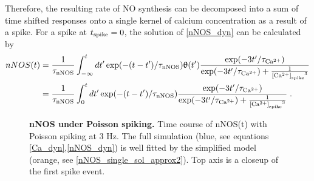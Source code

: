 \documentclass[10pt,letterpaper]{article}
\begin{document}
Therefore, the resulting rate of NO synthesis can be decomposed into a sum of time shifted responses onto a single kernel of calcium concentration as a result of a spike. For a spike at $t_{\rm spike}=0$, the solution of \eqref{nNOS_dyn} can be calculated by
\begin{equation}
\begin{split}
nNOS(t) &= \frac{1}{\tau_{\rm nNOS}}\int_{-\infty}^t dt' \exp(-(t-t')/\tau_{\rm nNOS}) \uptheta(t') \frac{\exp(-3t'/\tau_{\rm Ca^{2+}})}{\exp(-3t'/\tau_{\rm Ca^{2+}}) + \frac{1}{{{\rm [Ca^{2+}]}_{\rm spike}}^3}} \\
&= \frac{1}{\tau_{\rm nNOS}}\int_{0}^t dt' \exp(-(t-t')/\tau_{\rm nNOS}) \frac{\exp(-3t'/\tau_{\rm Ca^{2+}})}{\exp(-3t'/\tau_{\rm Ca^{2+}}) + \frac{1}{{{\rm [Ca^{2+}]}_{\rm spike}}^3}}\;.
\end{split}\label{nNOS_single_sol}
\end{equation}

\begin{figure}
\begin{center}
\end{center}
\caption{{\bf nNOS under Poisson spiking.} Time course of nNOS(t) with Poisson spiking at 3 Hz. The full simulation (blue, see equations \eqref{Ca_dyn},\eqref{nNOS_dyn}) is well fitted by the simplified model (orange, see \eqref{nNOS_single_sol_approx2}). Top axis is a closeup of the first spike event.}
\label{nNOS_approx_plot}
\end{figure}
\end{document}
